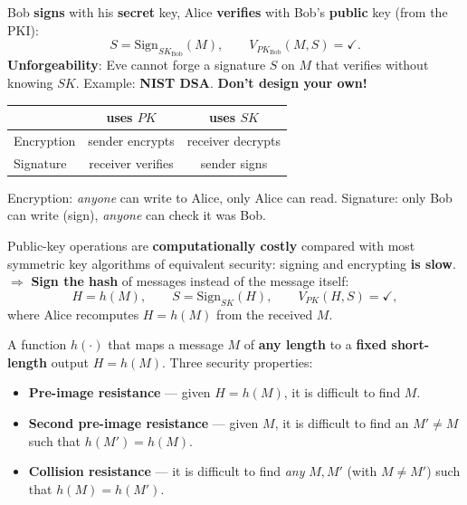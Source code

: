 \begin{defnbox}[title=Digital signatures (signing and verification)]
Bob \textbf{signs} with his \textbf{secret} key, Alice \textbf{verifies} with Bob's
\textbf{public} key (from the PKI):
\[
  S = \mathrm{Sign}_{SK_{\text{Bob}}}(M), \qquad
  V_{PK_{\text{Bob}}}(M, S) = \checkmark .
\]
\textbf{Unforgeability}: Eve cannot forge a signature $S$ on $M$ that verifies without
knowing $SK$. Example: \textbf{NIST DSA}. \textbf{Don't design your own!}
\end{defnbox}

\begin{rembox}[title=Encryption vs.\ signature: who uses which key?]
\begin{center}
\begin{tabular}{l|c|c}
                   & \textbf{uses $PK$} & \textbf{uses $SK$} \\ \hline
Encryption         & sender encrypts    & receiver decrypts  \\
Signature          & receiver verifies  & sender signs
\end{tabular}
\end{center}
Encryption: \emph{anyone} can write to Alice, only Alice can read. Signature: only Bob can
write (sign), \emph{anyone} can check it was Bob.
\end{rembox}

\begin{propbox}[title=Sign the hash of messages]
Public-key operations are \textbf{computationally costly} compared with most symmetric
key algorithms of equivalent security: signing and encrypting \textbf{is slow}. \\
$\Rightarrow$ \textbf{Sign the hash} of messages instead of the message itself:
\[
  H = h(M), \qquad S = \mathrm{Sign}_{SK}(H), \qquad V_{PK}(H, S) = \checkmark ,
\]
where Alice recomputes $H = h(M)$ from the received $M$.
\end{propbox}

\begin{defnbox}[title=Hash function]
A function $h(\cdot)$ that maps a message $M$ of \textbf{any length} to a \textbf{fixed
short-length} output $H = h(M)$. Three security properties:
\begin{itemize}
  \item \textbf{Pre-image resistance} --- given $H = h(M)$, it is difficult to find $M$.
  \item \textbf{Second pre-image resistance} --- given $M$, it is difficult to find an
        $M' \neq M$ such that $h(M') = h(M)$.
  \item \textbf{Collision resistance} --- it is difficult to find \emph{any} $M, M'$
        (with $M \neq M'$) such that $h(M) = h(M')$.
\end{itemize}
\end{defnbox}

